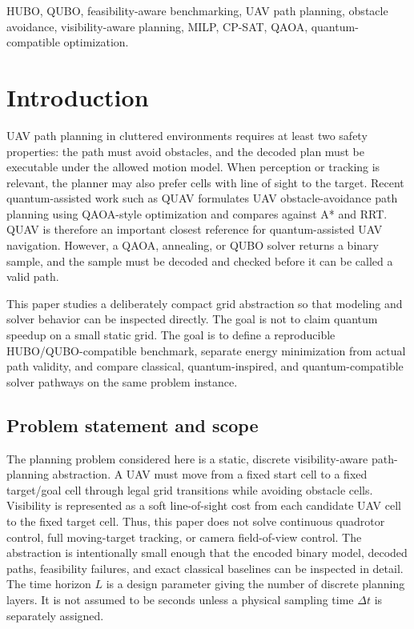 \documentclass[10pt,conference]{IEEEtran}
\begin{document}
\begin{IEEEkeywords}
HUBO, QUBO, feasibility-aware benchmarking, UAV path planning, obstacle avoidance, visibility-aware planning, MILP, CP-SAT, QAOA, quantum-compatible optimization.
\end{IEEEkeywords}

\section{Introduction}
UAV path planning in cluttered environments requires at least two safety properties: the path must avoid obstacles, and the decoded plan must be executable under the allowed motion model. When perception or tracking is relevant, the planner may also prefer cells with line of sight to the target. Recent quantum-assisted work such as QUAV formulates UAV obstacle-avoidance path planning using QAOA-style optimization and compares against A* and RRT. QUAV is therefore an important closest reference for quantum-assisted UAV navigation. However, a QAOA, annealing, or QUBO solver returns a binary sample, and the sample must be decoded and checked before it can be called a valid path.

This paper studies a deliberately compact grid abstraction so that modeling and solver behavior can be inspected directly. The goal is not to claim quantum speedup on a small static grid. The goal is to define a reproducible HUBO/QUBO-compatible benchmark, separate energy minimization from actual path validity, and compare classical, quantum-inspired, and quantum-compatible solver pathways on the same problem instance.

\subsection{Problem statement and scope}
The planning problem considered here is a static, discrete visibility-aware path-planning abstraction. A UAV must move from a fixed start cell to a fixed target/goal cell through legal grid transitions while avoiding obstacle cells. Visibility is represented as a soft line-of-sight cost from each candidate UAV cell to the fixed target cell. Thus, this paper does not solve continuous quadrotor control, full moving-target tracking, or camera field-of-view control. The abstraction is intentionally small enough that the encoded binary model, decoded paths, feasibility failures, and exact classical baselines can be inspected in detail. The time horizon $L$ is a design parameter giving the number of discrete planning layers. It is not assumed to be seconds unless a physical sampling time $\Delta t$ is separately assigned.
\end{document}
